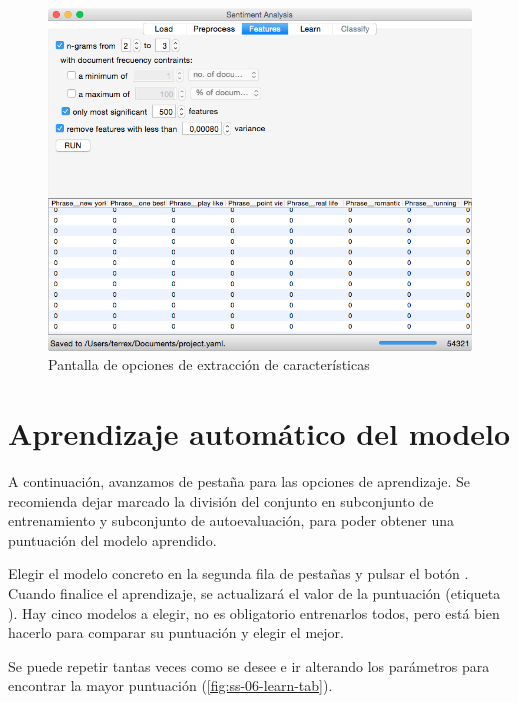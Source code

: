 \begin{figure}[H]
\centering
\includegraphics[width=14cm]{ss-05-feat-tab}
\caption{Pantalla de opciones de extracción de características}
\label{fig:ss-05-feat-tab}
\end{figure}

\newpage
\section{Aprendizaje automático del modelo}
\label{sec:manual-learn}

A continuación, avanzamos de pestaña para las opciones de aprendizaje. Se recomienda dejar marcado la división del conjunto en subconjunto de entrenamiento y subconjunto de autoevaluación, para poder obtener una puntuación del modelo aprendido.

Elegir el modelo concreto en la segunda fila de pestañas y pulsar el botón . Cuando finalice el aprendizaje, se actualizará el valor de la puntuación (etiqueta ). Hay cinco modelos a elegir, no es obligatorio entrenarlos todos, pero está bien hacerlo para comparar su puntuación y elegir el mejor.

Se puede repetir tantas veces como se desee e ir alterando los parámetros para encontrar la mayor puntuación (\autoref{fig:ss-06-learn-tab}).

